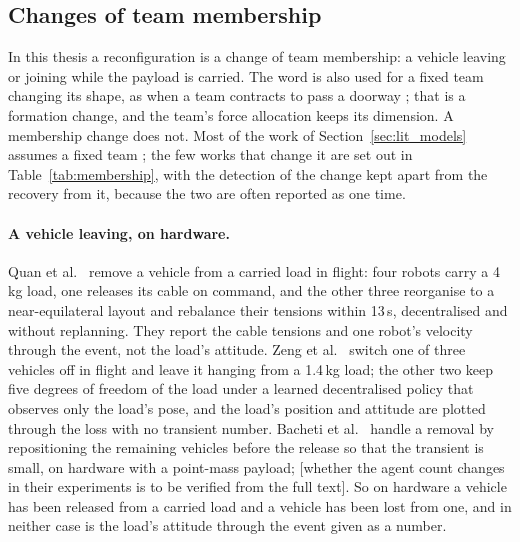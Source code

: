 
\subsection{Changes of team membership}
\label{sec:lit_team}

In this thesis a reconfiguration is a change of team membership: a vehicle leaving or joining while the payload
is carried. The word is also used for a fixed team changing its shape, as when a team contracts to pass a doorway
\cite{jackson2020scalable, tensionbased}; that is a formation change, and the team's force allocation keeps its
dimension. A membership change does not. Most of the work of Section~\ref{sec:lit_models} assumes a fixed team
\cite{efficient, wahbaKinodynamicMotionPlanning2024, quan2025swarm}; the few works that change it are set out in
Table~\ref{tab:membership}, with the detection of the change kept apart from the recovery from it, because the
two are often reported as one time.

\paragraph{A vehicle leaving, on hardware.} Quan et al.\ \cite{quan2025swarm} remove a vehicle from a carried
load in flight: four robots carry a 4\,kg load, one releases its cable on command, and the other three
reorganise to a near-equilateral layout and rebalance their tensions within 13\,s, decentralised and without
replanning. They report the cable tensions and one robot's velocity through the event, not the load's attitude.
Zeng et al.\ \cite{zeng2025marl} switch one of three vehicles off in flight and leave it hanging from a 1.4\,kg
load; the other two keep five degrees of freedom of the load under a learned decentralised policy that observes
only the load's pose, and the load's position and attitude are plotted through the loss with no transient
number. Bacheti et al.\ \cite{tensionbased} handle a removal by repositioning the remaining vehicles before the
release so that the transient is small, on hardware with a point-mass payload; [whether the agent count changes
in their experiments is to be verified from the full text]. So on hardware a vehicle has been released from a
carried load and a vehicle has been lost from one, and in neither case is the load's attitude through the event
given as a number.

